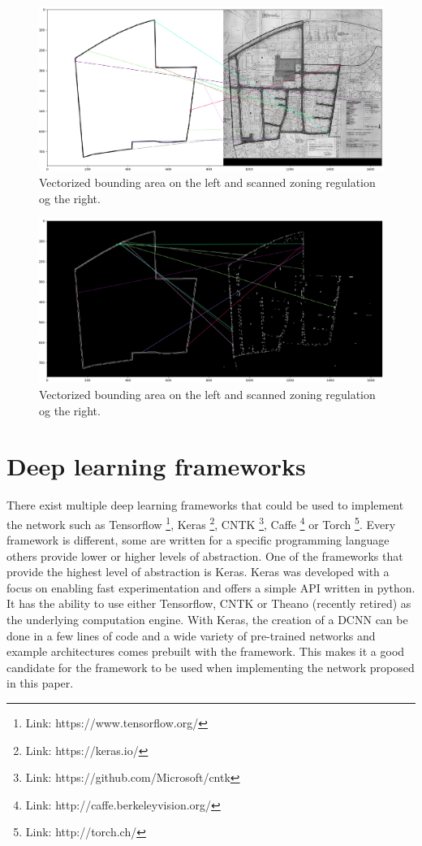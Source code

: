 \begin{figure}[H]
	\centering
	\includegraphics[width=0.8\linewidth]{fig/test1.png}
	\caption{Vectorized bounding area on the left and scanned zoning regulation og the right.}
	\label{fig:test1}
\end{figure}

\begin{figure}[H]
	\centering
	\includegraphics[width=0.8\linewidth]{fig/test1-thresh.png}
	\caption{Vectorized bounding area on the left and scanned zoning regulation og the right.}
	\label{fig:thresh}
\end{figure}

\section{Deep learning frameworks}
There exist multiple deep learning frameworks that could be used to implement the network such as Tensorflow \footnote{Link: https://www.tensorflow.org/}, Keras \footnote{Link: https://keras.io/}, CNTK \footnote{Link: https://github.com/Microsoft/cntk}, Caffe \footnote{Link: http://caffe.berkeleyvision.org/} or Torch \footnote{Link: http://torch.ch/}.  Every framework is different, some are written for a specific programming language others provide lower or higher levels of abstraction. One of the frameworks that provide the highest level of abstraction is Keras. Keras was developed with a focus on enabling fast experimentation and offers a simple API written in python. It has the ability to use either Tensorflow, CNTK or Theano (recently retired) as the underlying computation engine. With Keras, the creation of a DCNN can be done in a few lines of code and a wide variety of pre-trained networks and example architectures comes prebuilt with the framework. This makes it a good candidate for the framework to be used when implementing the network proposed in this paper. 


